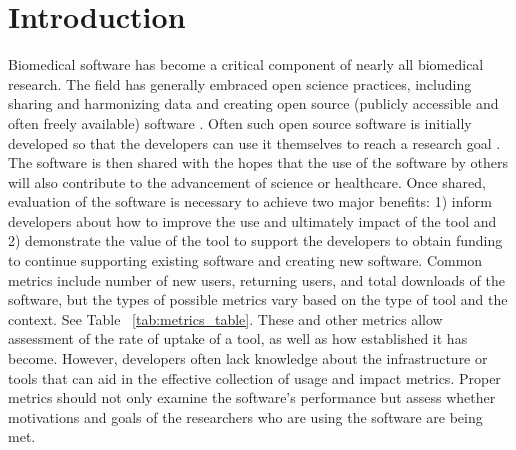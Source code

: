 \documentclass{article}
\begin{document}


\section{Introduction} Biomedical software has become a critical component of nearly all biomedical research. The field has generally embraced open science practices, including sharing and harmonizing data and creating open source (publicly accessible and often freely available) software \cite{green_strategic_2020, levet_developing_2021, itcr_open-source_2021, merow_better_2023}. Often such open source software is initially developed so that the developers can use it themselves to reach a research goal \cite{bitzer_intrinsic_2007}. The software is then shared with the hopes that the use of the software by others will also contribute to the advancement of science or healthcare. Once shared, evaluation of the software is necessary to achieve two major benefits: 1) inform developers about how to improve the use and ultimately impact of the tool and 2) demonstrate the value of the tool to support the developers to obtain funding to continue supporting existing software and creating new software. Common metrics include number of new users, returning users, and total downloads of the software, but the types of possible metrics vary based on the type of tool and the context. See Table ~\ref{tab:metrics_table}. These and other metrics allow assessment of the rate of uptake of a tool, as well as how established it has become. However, developers often lack knowledge about the infrastructure or tools that can aid in the effective collection of usage and impact metrics. Proper metrics should not only examine the software's performance but assess whether motivations and goals of the researchers who are using the software are being met.
\end{document}
